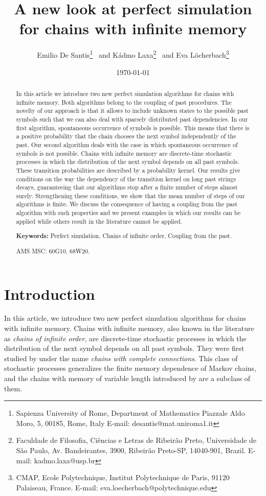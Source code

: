\documentclass[a4paper]{article}
\title{\textbf{\Large{A new look at perfect simulation for chains with infinite memory}}}
\author{Emilio De Santis\footnote{Sapienza University of Rome, Department of Mathematics Piazzale Aldo Moro, 5, 00185, Rome, Italy
E-mail: desantis@mat.uniroma1.it} \ and Kádmo Laxa\footnote{Faculdade de Filosofia, Ciências e Letras de Ribeirão Preto, Universidade de São Paulo, Av. Bandeirantes, 3900,
Ribeirão Preto-SP, 14040-901, Brazil.
E-mail: kadmo.laxa@usp.br} \ and Eva Löcherbach\footnote{CMAP, Ecole Polytechnique, Institut Polytechnique de Paris, 91120 Palaiseau, France. E-mail: eva.loecherbach@polytechnique.edu}}
\date{\today}
\begin{document}
\maketitle



\begin{abstract}
In this article we introduce two new perfect simulation algorithms for chains with infinite memory. Both algorithms belong to the coupling of past procedures. The novelty of our approach is that it allows to include unknown states to the possible past symbols such that we can also deal with sparsely distributed past dependencies. In our first algorithm, spontaneous occurrence of symbols is possible. This means that there is a positive probability that the chain chooses the next symbol independently of the past. Our second algorithm deals with the case in which spontaneous occurrence of symbols is not possible. Chains with infinite memory are discrete-time stochastic processes in which the distribution of the next symbol depends on all past symbols. These transition probabilities are described by a probability kernel. Our results give conditions on the way the dependency of the transition kernel on long past strings decays, guaranteeing that our algorithms stop after a finite number of steps almost surely.  Strengthening these conditions, we show that the mean number of steps of our algorithms is finite. We discuss the consequence of having a coupling from the past algorithm with such properties and we present examples in which our results can be applied while others result in the literature cannot be applied.

\textbf{Keywords: } Perfect simulation, Chains of infinite order, Coupling from the past.   

AMS MSC: 60G10, 68W20.  	  	%
\end{abstract}

\section{Introduction}
In this article, we introduce two new perfect simulation algorithms for chains with infinite memory. Chains with infinite memory, also known in the literature as \textit{chains of infinite order}, are discrete-time stochastic processes in which the distribution of the next symbol depends on all past symbols. They were first studied by \cite{completeconections} under the name \textit{chains with complete connections}. This class of stochastic processes generalizes the finite memory dependence of Markov chains, and the chains with memory of variable length introduced by \cite{rissanen} are a subclass of them.
\end{document}
